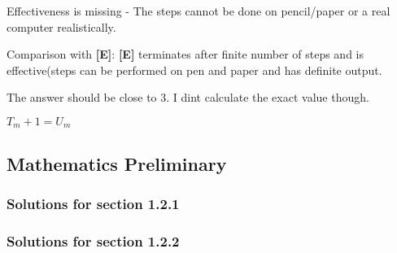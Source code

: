 \documentclass[12pt]{article}
\begin{document}
\begin{enumerate}
\begin{item}
\begin{itemize}
    \begin{item}
      Effectiveness is missing - The steps cannot be done on pencil/paper or a real computer realistically.
    \end {item}

    Comparison with {\bf[E]}:
    {\bf[E]} terminates after finite number of steps and is effective(steps can be performed on pen and paper and has definite output.
  \end{itemize}
\end{item}

\begin{item}

 The answer should be close to 3. I dint calculate the exact value though.
  
\end{item}

\begin{item}

  $T_{m} +1 = U_{m}$

\end{item}


\end{enumerate}

\subsection{Mathematics Preliminary}
\subsubsection{Solutions for section 1.2.1}

\subsubsection{Solutions for section 1.2.2}
\end{document}

